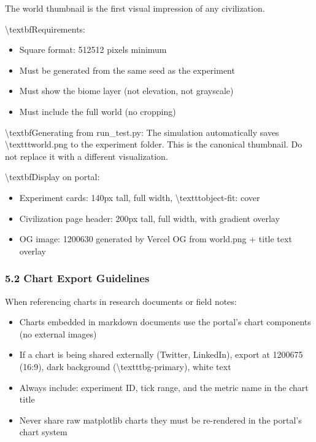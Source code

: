 \documentclass[11pt,a4paper]{article}
\begin{document}
The world thumbnail is the first visual impression of any civilization.

\textbackslash{}textbf{Requirements:}
\begin{itemize}
  \item Square format: 512512 pixels minimum
  \item Must be generated from the same seed as the experiment
  \item Must show the biome layer (not elevation, not grayscale)
  \item Must include the full world (no cropping)
\end{itemize}

\textbackslash{}textbf{Generating from run\_test.py:}
The simulation automatically saves \textbackslash{}texttt{world.png} to the experiment folder. This is the canonical thumbnail. Do not replace it with a different visualization.

\textbackslash{}textbf{Display on portal:}
\begin{itemize}
  \item Experiment cards: 140px tall, full width, \textbackslash{}texttt{object-fit: cover}
  \item Civilization page header: 200px tall, full width, with gradient overlay
  \item OG image: 1200630 generated by Vercel OG from world.png + title text overlay
\end{itemize}

\subsubsection*{5.2 Chart Export Guidelines}

When referencing charts in research documents or field notes:

\begin{itemize}
  \item Charts embedded in markdown documents use the portal's chart components (no external images)
  \item If a chart is being shared externally (Twitter, LinkedIn), export at 1200675 (16:9), dark background (\textbackslash{}texttt{bg-primary}), white text
  \item Always include: experiment ID, tick range, and the metric name in the chart title
  \item Never share raw matplotlib charts  they must be re-rendered in the portal's chart system
\end{itemize}
\end{document}
